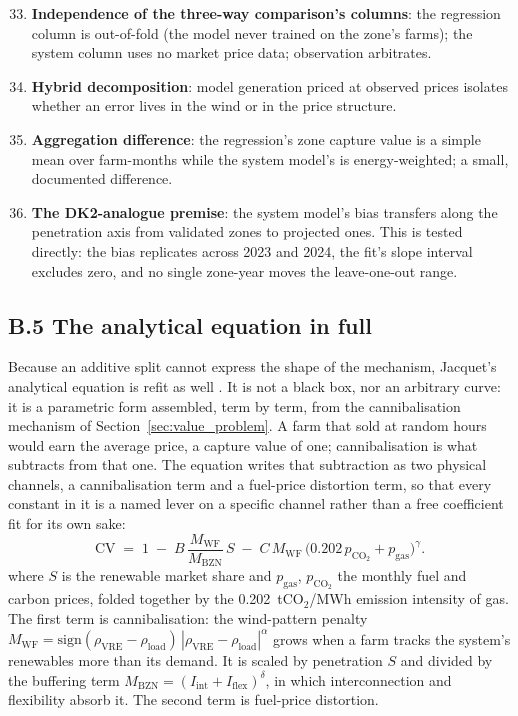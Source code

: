 \begin{enumerate}\setcounter{enumi}{32}
    \item \textbf{Independence of the three-way comparison's columns}: the regression
    column is out-of-fold (the model never trained on the zone's farms);
    the system column uses no market price data; observation arbitrates.
    \item \textbf{Hybrid decomposition}: model generation priced at
    observed prices isolates whether an error lives in the wind or in the
    price structure.
    \item \textbf{Aggregation difference}: the regression's zone capture
    value is a simple mean over farm-months while the system model's
    is energy-weighted; a small, documented difference.
    \item \textbf{The DK2-analogue premise}: the system model's bias
    transfers along the penetration axis from validated zones to projected
    ones. This is tested directly: the bias replicates across 2023 and 2024,
    the fit's slope interval excludes zero, and no single zone-year moves
    the leave-one-out range.
\end{enumerate}

\subsection*{B.5 The analytical equation in full}

Because an additive split cannot express the shape of the mechanism,
Jacquet's analytical equation is refit as well \cite{Jacquet2024}. It is not a
black box, nor an arbitrary curve: it is a parametric form assembled, term by term,
from the cannibalisation mechanism of Section~\ref{sec:value_problem}. A farm
that sold at random hours would earn the average price, a capture value of one;
cannibalisation is what subtracts from that one. The equation writes that
subtraction as two physical channels, a cannibalisation term and a fuel-price
distortion term, so that every constant in it is a named lever on a specific
channel rather than a free coefficient fit for its own sake:
%
\begin{equation}
    \mathrm{CV} \;=\; 1
    \;-\; B\,\frac{M_{\mathrm{WF}}}{M_{\mathrm{BZN}}}\,S
    \;-\; C\,M_{\mathrm{WF}}\,
    \bigl(0.202\,p_{\mathrm{CO_2}} + p_{\mathrm{gas}}\bigr)^{\gamma}.
\end{equation}
%
where $S$ is the renewable market share and $p_{\mathrm{gas}}$,
$p_{\mathrm{CO_2}}$ the monthly fuel and carbon prices, folded together by the
0.202~tCO$_2$/MWh emission intensity of gas. The first term is cannibalisation:
the wind-pattern penalty $M_{\mathrm{WF}} = \mathrm{sign}(\rho_{\mathrm{VRE}} -
\rho_{\mathrm{load}})\,|\rho_{\mathrm{VRE}} - \rho_{\mathrm{load}}|^{\alpha}$
grows when a farm tracks the system's renewables more than its demand. It is
scaled by penetration $S$ and divided by the buffering term
$M_{\mathrm{BZN}} = (I_{\mathrm{int}} + I_{\mathrm{flex}})^{\delta}$, in which
interconnection and flexibility absorb it. The second term is fuel-price
distortion.

